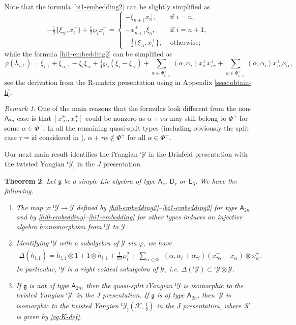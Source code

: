 \documentclass[11pt,reqno]{amsart}
\numberwithin{equation}{section}
\newtheorem{thm}{Theorem}[section]
\theoremstyle{definition}
\theoremstyle{remark}
\newtheorem{rem}[thm]{Remark}
\newcommand{\beq}{\begin{equation}}
\newcommand{\eeq}{\end{equation}}
\newcommand{\be}{\begin{equation*}}
\newcommand{\ee}{\end{equation*}}
\newcommand{\hf}{\tfrac12}
\newcommand{\g}{\mathfrak{g}}
\newcommand{\tl}{\tilde}
\newcommand{\Y}{{\mathscr{Y}}}
\newcommand{\Yi}{{^\imath\mathscr{Y}}}
\newcommand{\YiJ}{{^\imath\mathscr{Y}_{\jmath}}}
\newcommand{\acomm}[2]{\bigl\{#1,#2\bigr\}}
\begin{document}
Note that the formula \eqref{bi1-embedding2} can be slightly simplified as 
\be
-\tfrac12\acomm{\xi_{\tau i}}{x_i^{+}}+\hf\wp_i x_i^+=\begin{cases}
       -\xi_{n+1}x_n^+,&\text{ if }i=n,\\
       -x_{n+1}^+\xi_n,&\text{ if }i=n+1,\\
    -\tfrac12\acomm{\xi_{\tau i}}{x_i^{+}},&\text{ otherwise;}
       \end{cases}
\ee
while the formula \eqref{hi1-embedding2} can be simplified as
\beq\label{eq:hi1-simle}
\varphi(h_{i,1})={}\xi_{i,1}+\xi_{\tau i,1}
      -\xi_{i}\xi_{\tau i}+\tfrac14\wp_i(\xi_i-\xi_{\tau i})+\sum_{\alpha\in\Phi^+_{i,<}}(\alpha,\alpha_i)x_\alpha^+x_{\tau\alpha}^++\sum_{\alpha\in\Phi^+_{i,>}}(\alpha,\alpha_i)x_{\tau\alpha}^+x_\alpha^+,
\eeq
see the derivation from the R-matrix presentation using \cite{LZ24} in Appendix \ref{ssec:obtain-h}. 

\begin{rem}
One of the main reasons that the formulas look different from the non-$\mathsf A_{2n}$ case is that $[x_{\tau\alpha}^+,x_\alpha^+]$ could be nonzero as  $\alpha+\tau\alpha$ may still belong to $\Phi^+$ for some $\alpha\in\Phi^+$. In all the remaining quasi-split types (including obviously the split case $\tau=\mathrm{id}$ considered in \cite{Lu26min}), $\alpha+\tau\alpha\notin \Phi^+$  for all $\alpha\in\Phi^+$.    
\end{rem}

Our next main result identifies the iYangian $\Yi$ in the Drinfeld
presentation with the twisted Yangian $\YiJ$
in the $J$ presentation.



\begin{thm}\label{thm:embed}
Let $\g$ be a simple Lie algebra of type $\mathsf A_{r}$, $\mathsf D_{r}$ or $\mathsf E_6$. We have the following.
\begin{enumerate}
    \item The map $\varphi:\Yi\to \Y$ defined by \eqref{hi0-embedding2}--\eqref{bi1-embedding2} for type $\mathsf A_{2n}$ and by \eqref{hi0-embedding}--\eqref{bi1-embedding} for other types induces an injective algebra homomorphism from $\Yi$ to $\Y$.
\item Identifying $\Yi$ with a subalgebra of $\Y$ via $\varphi$, we have
\beq\label{coprohi1}
\begin{split}
\Delta(\tl h_{i,1})=\tl h_{i,1}\otimes 1+1\otimes \tl h_{i,1}+\tfrac1{32}\wp_i^2+\sum_{\alpha\in\Phi^+}(\alpha,\alpha_i+\alpha_{\tau i})(x_{\tau\alpha}^+-x_{\alpha}^-)\otimes x_\alpha^+.
\end{split}
\eeq
In particular, $\Yi$ is a right coideal subalgebra of $\Y$, i.e. $\Delta(\Yi)\subset \Yi\otimes \Y$.
\item If $\g$ is not of type $\mathsf A_{2n}$, then the quasi-split iYangian $\Yi$ is isomorphic to the twisted Yangian $\YiJ$ in the $J$ presentation. If $\g$ is  of type $\mathsf A_{2n}$, then $\Yi$ is isomorphic to the twisted Yangian $\YiJ(\mathscr K,\tfrac18)$ in the $J$ presentation, where $\mathscr K$ is given by \eqref{eq:K-def}.
\end{enumerate}
\end{thm}
\end{document}
